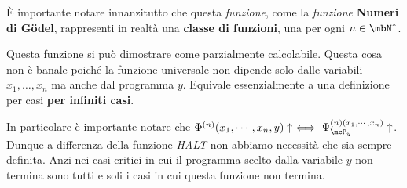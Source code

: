 È importante notare innanzitutto che questa \textit{funzione}, come la \textit{funzione} \textbf{Numeri di Gödel}, rappresenti in realtà una \textbf{classe di funzioni}, una per ogni \(n\in\mbN^*\).

Questa funzione si può dimostrare come parzialmente calcolabile. Questa cosa non è banale poiché la funzione universale non dipende solo dalle variabili \(x_1, \dots, x_n\) ma anche dal programma \(y\).
Equivale essenzialmente a una definizione per casi \textbf{per infiniti casi}.

In particolare è importante notare che \(\Phi^{(n)}(x_1,\cdots,x_n,y) \uparrow \iff \Psi_{\mcP_y}^{(n)(x_1,\cdots, x_n)} \uparrow\). Dunque a differenza della funzione \textit{HALT} non abbiamo necessità che sia sempre definita. Anzi nei casi critici in cui il programma scelto dalla variabile \(y\) non termina sono tutti e soli i casi in cui questa funzione non termina.

